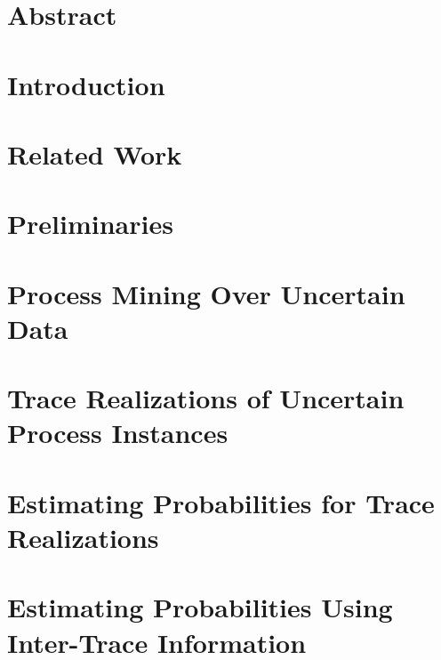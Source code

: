 \documentclass[a4paper,11pt,twoside]{pads-thesis}
\begin{document}

\gTitlePage

\chapter*{Abstract} 
\label{chap: abstract}

\tableofcontents

\cleardoublepage
\pagestyle{fancy}

\chapter{Introduction} 
\label{chap:intro}


\chapter{Related Work} 
\label{chap:related_work}


\chapter{Preliminaries} 
\label{chap:prelim}


\chapter{Process Mining Over Uncertain Data} \label{chap:fundamentals}


\chapter{Trace Realizations of Uncertain Process Instances} \label{chap:realizations}


\chapter{Estimating Probabilities for Trace Realizations}
\label{chap:estimates}


\chapter{Estimating Probabilities Using Inter-Trace Information}
\label{chap:logpatterns}

\end{document}
